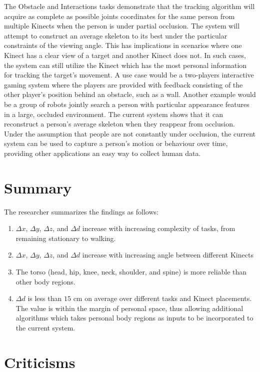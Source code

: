 The Obstacle and Interactions tasks demonstrate that the tracking algorithm will acquire as complete as possible joints coordinates for the same person from multiple Kinects when the person is under partial occlusion. The system will attempt to construct an average skeleton to its best under the particular constraints of the viewing angle. This has implications in scenarios where one Kinect has a clear view of a target and another Kinect does not. In such cases, the system can still utilize the Kinect which has the most personal information for tracking the target's movement. A use case would be a two-players interactive gaming system where the players are provided with feedback consisting of the other player's position behind an obstacle, such as a wall. Another example would be a group of robots jointly search a person with particular appearance features in a large, occluded environment. The current system shows that it can reconstruct a person's average skeleton when they reappear from occlusion. Under the assumption that people are not constantly under occlusion, the current system can be used to capture a person's motion or behaviour over time, providing other applications an easy way to collect human data.

\section{Summary}

The researcher summarizes the findings as follows:

\begin{enumerate}
  \item $\Delta x$, $\Delta y$, $\Delta z$, and $\Delta d$ increase with increasing complexity of tasks, from remaining stationary to walking.
  \item $\Delta x$, $\Delta y$, $\Delta z$, and $\Delta d$ increase with increasing angle between different Kinects
  \item The torso (head, hip, knee, neck, shoulder, and spine) is more reliable than other body regions.
  \item $\Delta d$ is less than $15$ cm on average over different tasks and Kinect placements. The value is within the margin of personal space, thus allowing additional algorithms which takes personal body regions as inputs to be incorporated to the current system.
\end{enumerate}

\section{Criticisms}
\label{sec:discussion_criticisms}

